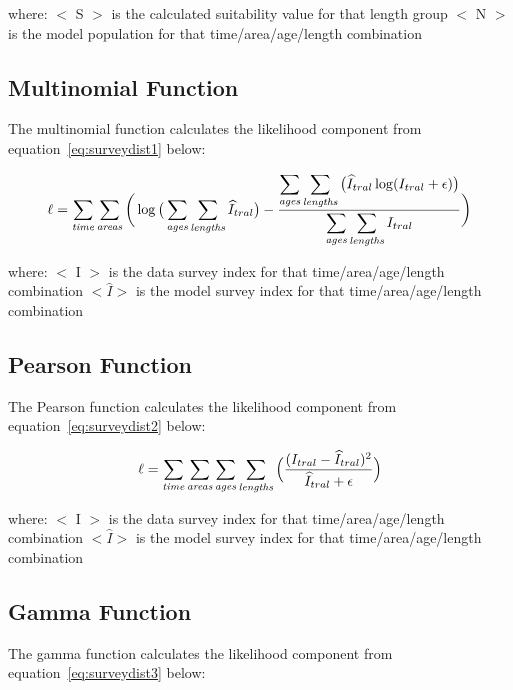 \documentclass[10pt,twoside]{book}
\begin{document}
where:\newline
$<$ S $>$ is the calculated suitability value for that length group\newline
$<$ N $>$ is the model population for that time/area/age/length combination

\subsection{Multinomial Function}
The multinomial function calculates the likelihood component from equation~\ref{eq:surveydist1} below:

\begin{equation}\label{eq:surveydist1}
\ell = \sum_{\it time}\sum_{\it areas} \bigg( \log \big(\sum_{\it ages}\sum_{\it lengths} \widehat{I}_{tral} \big) - {\frac { \displaystyle \sum_{\it ages}\sum_{\it lengths} \big(\widehat{I}_{tral} \log (I_{tral} + \epsilon) \big)} { \displaystyle \sum_{\it ages}\sum_{\it lengths} I_{tral}} } \bigg)
\end{equation}

where:\newline
$<$ I $>$ is the data survey index for that time/area/age/length combination\newline
$<\widehat{I}>$ is the model survey index for that time/area/age/length combination

\subsection{Pearson Function}
The Pearson function calculates the likelihood component from equation~\ref{eq:surveydist2} below:

\begin{equation}\label{eq:surveydist2}
\ell = \sum_{\it time}\sum_{\it areas}\sum_{\it ages}\sum_{\it lengths} \Big( {\frac{ ( I_{tral} - \widehat{I}_{tral} ) ^2} {\widehat{I}_{tral} + \epsilon}} \Big)
\end{equation}

where:\newline
$<$ I $>$ is the data survey index for that time/area/age/length combination\newline
$<\widehat{I}>$ is the model survey index for that time/area/age/length combination

\subsection{Gamma Function}
The gamma function calculates the likelihood component from equation~\ref{eq:surveydist3} below:
\end{document}

